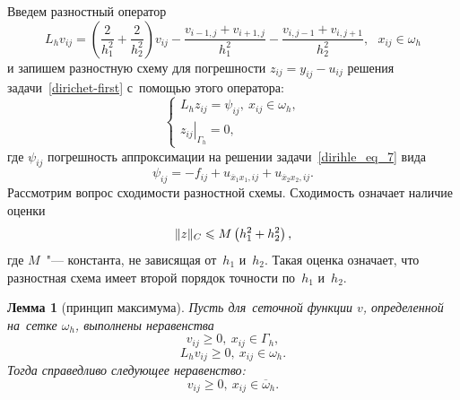 \documentclass[11pt,a4paper,twoside,listtotoc,bibtotoc]{report}
\numberwithin{equation}{section}
\theoremstyle{definition}
\theoremstyle{plain}
\newtheorem*{lemma*}{Лемма}
\DeclarePairedDelimiter\norm{\lVert}{\rVert}
\begin{document}
%
Введем разностный оператор
%
$$
    L_hv_{ij} = \left(\frac{2}{h_1^2}+\frac{2}{h_2^2}\right)v_{ij}-
    \frac{v_{i-1,j}+v_{i+1,j}}{h_1^2} - \frac{v_{i,j-1}+v_{i,j+1}}{h_2^2},
    ~~~x_{ij}\in\omega_h
$$
%
и запишем разностную схему для погрешности $z_{ij} = y_{ij} - u_{ij}$
решения задачи~\eqref{dirichet-first}
с~помощью этого оператора:
%
\begin{equation}
    \label{err-scheme}
    \begin{cases}
        L_hz_{ij}=\psi_{ij},~x_{ij}\in\omega_h,\\
        \left.z_{ij}\right\vert_{\Gamma_h}=0,
    \end{cases}
\end{equation}
%
где $\psi_{ij}$ погрешность
аппроксимации на решении задачи~\eqref{dirihle_eq_7} вида
%
$$
    \psi_{ij} = -f_{ij} + u_{\overline{x}_1x_1,ij} + u_{\overline{x}_2x_2,ij}.
$$
%
Рассмотрим вопрос сходимости разностной схемы. Сходимость означает наличие
оценки
%
$$
    \norm{z}_C \leqslant M\left(h_1^2 + h_2^2\right),
$$
%
где $M$~"--- константа, не зависящая от~$h_1$ и~$h_2$. Такая оценка означает, что
разностная схема имеет второй порядок точности по~$h_1$ и~$h_2$.
%
\begin{lemma*}[принцип максимума]
    Пусть для~сеточной функции $v$, определенной на~сетке $\omega_h$, выполнены
    неравенства
    $$
        v_{ij} \geqslant 0,~x_{ij} \in \Gamma_h,
    $$
    $$
        L_hv_{ij} \geqslant 0,~x_{ij} \in \omega_h.
    $$
    Тогда справедливо следующее неравенство:
    $$
        v_{ij} \geqslant 0,~x_{ij}\in\overline{\omega}_h.
    $$
\end{lemma*}
%
%
\end{document}
